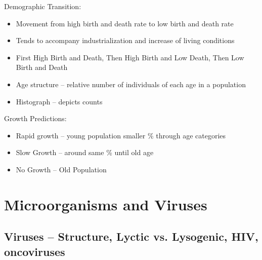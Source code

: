 \documentclass{article}
\begin{document}
Demographic Transition:
\begin{itemize}
\item Movement from high birth and death rate to low birth and death rate
\item Tends to accompany industrialization and increase of living conditions
\item First High Birth and Death, Then High Birth and Low Death, Then Low Birth and Death
\end{itemize}

\begin{itemize}
\item Age structure -- relative number of individuals of each age in a population
\item Histograph -- depicts counts
\end{itemize}

Growth Predictions:
\begin{itemize}
\item Rapid growth -- young population smaller \% through age categories
\item Slow Growth -- around same \% until old age
\item No Growth -- Old Population
\end{itemize}

\section{Microorganisms and Viruses}

\subsection{Viruses -- Structure, Lyctic vs. Lysogenic, HIV, oncoviruses}
\end{document}
